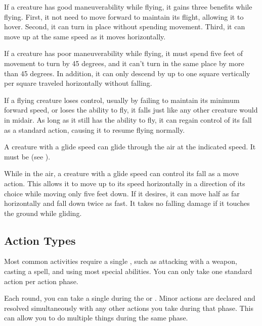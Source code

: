             If a creature has good maneuverability while flying, it gains three benefits while flying.
            First, it not need to move forward to maintain its flight, allowing it to hover.
            Second, it can turn in place without spending movement.
            Third, it can move up at the same speed as it moves horizontally.

             If a creature has poor maneuverability while flying, it must spend five feet of movement to turn by 45 degrees, and it can't turn in the same place by more than 45 degrees. In addition, it can only descend by up to one square vertically per square traveled horizontally without falling.

             If a flying creature loses control, usually by failing to maintain its minimum forward speed, or loses the ability to fly, it falls just like any other creature would in midair. As long as it still has the ability to fly, it can regain control of its fall as a standard action, causing it to resume flying normally.

            \label{Gliding}
            A creature with a glide speed can glide through the air at the indicated speed. It must be  (see ).

            While in the air, a creature with a glide speed can control its fall as a move action. This allows it to move up to its speed horizontally in a direction of its choice while moving only five feet down. If it desires, it can move half as far horizontally and fall down twice as fast. It takes no falling damage if it touches the ground while gliding.

    \subsection{Action Types}

         Most common activities require a single , such as attacking with a weapon, casting a spell, and using most special abilities.
        You can only take one standard action per action phase.

        \label{Minor Actions} Each round, you can take a single  during the  or .
        Minor actions are declared and resolved simultaneously with any other actions you take during that phase.
        This can allow you to do multiple things during the same phase.

